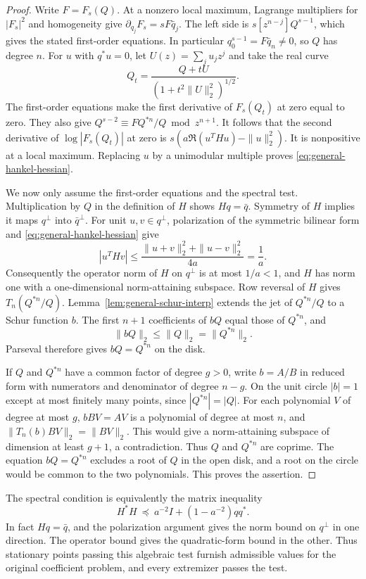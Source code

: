\documentclass[11pt]{article}
\begin{document}
\begin{proof}
Write \(F=F_s(Q)\). At a nonzero local maximum, Lagrange
multipliers for \(|F_s|^2\) and homogeneity give
\(\partial_{q_j}F_s=sF\bar q_j\). The left side is
\(s[z^{n-j}]Q^{s-1}\), which gives the stated first-order
equations. In particular \(q_0^{s-1}=F\bar q_n\ne0\), so
\(Q\) has degree \(n\). For \(u\) with \(q^*u=0\), let
\(U(z)=\sum_j u_j z^j\) and take the real curve
\[
 Q_t=\frac{Q+tU}{(1+t^2\|U\|_2^2)^{1/2}}.
\]
The first-order equations make the first derivative of
\(F_s(Q_t)\) at zero equal to zero. They also give
\(
 Q^{s-2}\equiv F Q^{*n}/Q\bmod z^{n+1}.
\)
It follows that the second derivative of
\(\log|F_s(Q_t)|\) at zero is
\(s(a\Re(u^T H u)-\|u\|_2^2)\). It is nonpositive at a
local maximum. Replacing \(u\) by a unimodular multiple proves
\eqref{eq:general-hankel-hessian}.

We now only assume the first-order equations and the spectral
test. Multiplication by \(Q\) in the definition of \(H\) shows
\(Hq=\bar q\). Symmetry of \(H\) implies it maps \(q^\perp\)
into \(\bar q^\perp\).
For unit \(u,v\in q^\perp\), polarization of the symmetric
bilinear form and \eqref{eq:general-hankel-hessian} give
\[
 |u^T H v|
 \le \frac{\|u+v\|_2^2+\|u-v\|_2^2}{4a}=\frac1a .
\]
Consequently the operator norm of \(H\) on \(q^\perp\) is at
most \(1/a<1\), and \(H\) has norm one with a one-dimensional
norm-attaining subspace. Row reversal of \(H\) gives
\(T_n(Q^{*n}/Q)\). Lemma~\ref{lem:general-schur-interp} extends
the jet of \(Q^{*n}/Q\) to a Schur function \(b\).
The first \(n+1\) coefficients of \(bQ\) equal
those of \(Q^{*n}\), and
\[
 \|bQ\|_2\le\|Q\|_2=\|Q^{*n}\|_2 .
\]
Parseval therefore gives \(bQ=Q^{*n}\) on the disk.

If \(Q\) and \(Q^{*n}\) have a common factor of degree \(g>0\),
write \(b=A/B\) in reduced form with numerators and denominator
of degree \(n-g\). On the unit circle \(|b|=1\) except at most
finitely many points, since \(|Q^{*n}|=|Q|\). For each polynomial
\(V\) of degree at most \(g\), \(bBV=AV\) is a polynomial of
degree at most \(n\), and
\(\|T_n(b)BV\|_2=\|BV\|_2\).
This would give a norm-attaining subspace of dimension at least
\(g+1\), a contradiction. Thus \(Q\) and \(Q^{*n}\) are coprime.
The equation \(bQ=Q^{*n}\) excludes a root of \(Q\) in the open
disk, and a root on the circle would be common to the two
polynomials. This proves the assertion.
\end{proof}

The spectral condition is equivalently the matrix inequality
\[
 H^*H\ \preceq\ a^{-2}I+(1-a^{-2})qq^* .
\]
In fact \(Hq=\bar q\), and the polarization argument gives the
norm bound on \(q^\perp\) in one direction. The operator bound
gives the quadratic-form bound in the other.
Thus stationary points passing this algebraic test furnish
admissible values for the original coefficient problem, and
every extremizer passes the test.
\end{document}
